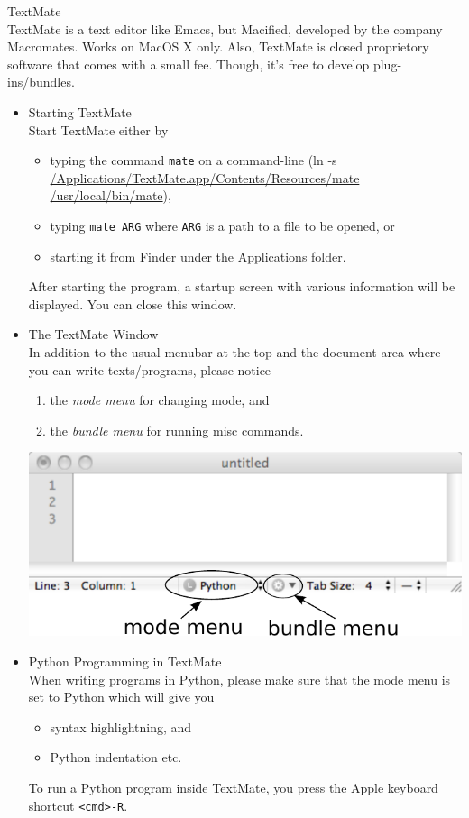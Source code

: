 \documentclass[a4,landscape]{seminar}
\begin{document}
\begin{slide}
  {\Large TextMate}\\[1ex]
  TextMate is a text editor like Emacs, but Macified, developed by the
  company Macromates. Works on MacOS X only. Also, TextMate is closed
  proprietory software that comes with a small fee. Though, it's free
  to develop plug-ins/bundles.
\begin{itemize}
  \item Starting TextMate\\[1ex]
    Start TextMate either by
    \begin{itemize}
    \item typing the command \texttt{mate} on a command-line (ln -s
      \url{/Applications/TextMate.app/Contents/Resources/mate} \url{/usr/local/bin/mate}),
    \item typing \texttt{mate ARG} where \texttt{ARG} is a path to a file to be opened, or
    \item starting it from Finder under the Applications folder.
    \end{itemize}
    After starting the program, a startup screen with various information will be
    displayed. You can close this window.
    \clearpage{}
  \item The TextMate Window\\[1ex]
    In addition to the usual menubar at the top and the document area
    where you can write texts/programs, please notice
    \begin{enumerate}
    \item the \emph{mode menu} for changing mode, and 
    \item the \emph{bundle menu} for running misc commands.
    \end{enumerate}\vspace{5mm}
    \begin{center}
      \includegraphics[scale=.7]{drawing.pdf}
    \end{center}
    \clearpage{}
  \item Python Programming in TextMate\\[1ex]
    When writing programs in Python, please make sure that the mode menu is set to
    Python which will give you
    \begin{itemize}
    \item syntax highlightning, and
    \item Python indentation etc.
    \end{itemize}
    To run a Python program inside TextMate, you press the Apple keyboard shortcut
    \texttt{<cmd>-R}.
  \end{itemize}
\end{slide}
\end{document}
